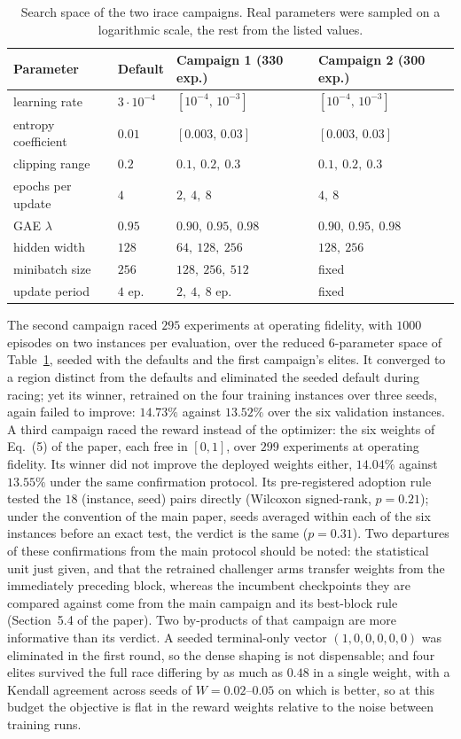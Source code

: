 \documentclass[preprint,12pt]{elsarticle}
\begin{document}
\begin{table}[t]
\centering\small
\caption{Search space of the two irace campaigns. Real parameters were
sampled on a logarithmic scale, the rest from the listed values.}
\label{sup:tab-irace}
\setlength{\tabcolsep}{5pt}
\begin{tabular}{llll}
\toprule
Parameter & Default & Campaign 1 (330 exp.) & Campaign 2 (300 exp.) \\
\midrule
learning rate & $3\cdot10^{-4}$ & $[10^{-4},\,10^{-3}]$ &
  $[10^{-4},\,10^{-3}]$ \\
entropy coefficient & $0.01$ & $[0.003,\,0.03]$ & $[0.003,\,0.03]$ \\
clipping range & $0.2$ & $0.1,\ 0.2,\ 0.3$ & $0.1,\ 0.2,\ 0.3$ \\
epochs per update & $4$ & $2,\ 4,\ 8$ & $4,\ 8$ \\
GAE $\lambda$ & $0.95$ & $0.90,\ 0.95,\ 0.98$ & $0.90,\ 0.95,\ 0.98$ \\
hidden width & $128$ & $64,\ 128,\ 256$ & $128,\ 256$ \\
minibatch size & $256$ & $128,\ 256,\ 512$ & fixed \\
update period & $4$ ep. & $2,\ 4,\ 8$ ep. & fixed \\
\bottomrule
\end{tabular}
\end{table}

The second campaign raced $295$ experiments at operating fidelity,
with $1000$ episodes on two instances per evaluation, over the
reduced $6$-parameter space of Table~\ref{sup:tab-irace}, seeded with
the defaults and the first campaign's elites. It converged to a
region distinct from the defaults and eliminated the seeded default
during racing; yet its winner, retrained on the four training
instances over three seeds, again failed to improve: $14.73\%$
against $13.52\%$ over the six validation instances.
A third campaign raced the reward instead of the optimizer: the six
weights of Eq.~(5) of the paper, each free in $[0,1]$, over $299$
experiments at operating fidelity. Its winner did not improve the
deployed weights either, $14.04\%$ against $13.55\%$ under the same
confirmation protocol. Its pre-registered adoption rule tested the
$18$ (instance, seed) pairs directly (Wilcoxon signed-rank,
$p=0.21$); under the convention of the main paper, seeds averaged
within each of the six instances before an exact test, the verdict is
the same ($p=0.31$). Two departures of these confirmations from the
main protocol should be noted: the statistical unit just given, and
that the retrained challenger arms transfer weights from the
immediately preceding block, whereas the incumbent checkpoints they
are compared against come from the main campaign and its best-block
rule (Section~5.4 of the paper). Two
by-products of that campaign are more informative than its verdict. A
seeded terminal-only vector $(1,0,0,0,0,0)$ was eliminated in the
first round, so the dense shaping is not dispensable; and four elites
survived the full race differing by as much as $0.48$ in a single
weight, with a Kendall agreement across seeds of $W=0.02$--$0.05$ on
which is better, so at this budget the objective is flat in the
reward weights relative to the noise between training runs.
\end{document}
